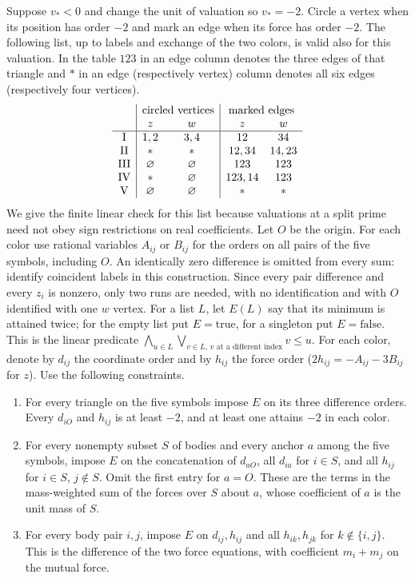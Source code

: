 \documentclass[11pt,letterpaper]{article}
\theoremstyle{definition}
\begin{document}
Suppose $v_*<0$ and change the unit of valuation so $v_*=-2$. Circle
a vertex when its position has order $-2$ and mark an edge when its
force has order $-2$. The following list, up to labels and exchange of
the two colors, is valid also for this valuation. In the table $123$
in an edge column denotes the three edges of that triangle and $*$ in
an edge (respectively vertex) column denotes all six edges
(respectively four vertices).
\[
\begin{array}{c|cc|cc}
 &\multicolumn{2}{c|}{\text{circled vertices}}&
       \multicolumn{2}{c}{\text{marked edges}}\\
 &z&w&z&w\\ \hline
 \mathrm I&1,2&3,4&12&34\\
 \mathrm {II}&*&*&12,34&14,23\\
 \mathrm {III}&\varnothing&\varnothing&123&123\\
 \mathrm {IV}&*&\varnothing&123,14&123\\
 \mathrm V&\varnothing&\varnothing&*&*
\end{array}
\]
We give the finite linear check for this list because valuations at
a split prime need not obey sign restrictions on real coefficients.
Let $O$ be the origin. For each color use rational variables $A_{ij}$
or $B_{ij}$ for the orders on all pairs of the five symbols,
including $O$. An identically zero difference is omitted from every
sum: identify coincident labels in this construction. Since every
pair difference and every $z_i$ is nonzero, only two runs are needed,
with no identification and with $O$ identified with one $w$ vertex.
For a list $L$, let $E(L)$ say that its minimum is attained twice;
for the empty list put $E=\mathrm{true}$, for a singleton put
$E=\mathrm{false}$. This is the linear predicate
$\bigwedge_{u\in L}\bigvee_{v\in L,\,v\text{ at a different index}}v\le u$.
For each color, denote by $d_{ij}$ the coordinate order and by
$h_{ij}$ the force order ($2h_{ij}=-A_{ij}-3B_{ij}$ for $z$).
Use the following constraints.
\begin{enumerate}
\item For every triangle on the five symbols impose $E$ on its
three difference orders. Every $d_{iO}$ and $h_{ij}$ is at least
$-2$, and at least one attains $-2$ in each color.
\item For every nonempty subset $S$ of bodies and every anchor $a$
among the five symbols, impose $E$ on the concatenation of
$d_{aO}$, all $d_{ia}$ for $i\in S$, and all $h_{ij}$ for $i\in S$,
$j\notin S$. Omit the first entry for $a=O$. These are the terms in
the mass-weighted sum of the forces over $S$ about $a$, whose
coefficient of $a$ is the unit mass of $S$.
\item For every body pair $i,j$, impose $E$ on $d_{ij},h_{ij}$ and
all $h_{ik},h_{jk}$ for $k\notin\{i,j\}$. This is the difference
of the two force equations, with coefficient $m_i+m_j$ on the mutual
force.
\end{enumerate}
\end{document}
